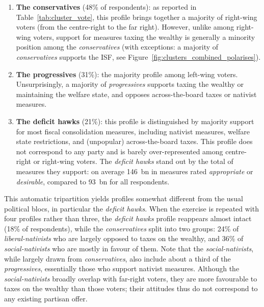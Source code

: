\documentclass[12pt,english]{article}
\newcommand{\blue}[1]{\textcolor{blue!60!black}{#1}}
\begin{document}
\begin{enumerate}
  \item \blue{\textbf{The conservatives} (48\% of respondents)}: as reported in Table~\ref{tab:cluster_vote}, this profile brings together a majority of right-wing voters (from the centre-right to the far right). However, unlike among right-wing voters, support for measures taxing the wealthy is generally a minority position among the \textit{conservatives} (with exceptions: a majority of \textit{conservatives} supports the ISF, see Figure~\ref{fig:clusters_combined_polarises}).
  \item \blue{\textbf{The progressives} (31\%)}: the majority profile among left-wing voters.
  Unsurprisingly, a majority of \textit{progressives} supports taxing the wealthy or maintaining the welfare state, and opposes across-the-board taxes or nativist measures.
  \item \blue{\textbf{The deficit hawks} (21\%): this profile is distinguished by majority support for most fiscal consolidation measures, including nativist measures, welfare state restrictions, and (unpopular) across-the-board taxes.} This profile does not correspond to any party and is barely over-represented among centre-right or right-wing voters. \blue{The \textit{deficit hawks} stand out by the total of measures they support:
  on average 146~bn in measures rated \textit{appropriate} or \textit{desirable}, compared to 93~bn for all respondents.}
\end{enumerate}

\begin{table}[htbp]
  \centering
  \caption{Respondent profiles by political bloc in \texttt{budget} clusterings.}
  \label{tab:cluster_vote}
  
\end{table}

This automatic tripartition yields profiles somewhat different from the usual political blocs, in particular the \textit{deficit hawks}. When the exercise is repeated with four profiles rather than three, the \textit{deficit hawks} profile reappears almost intact (18\% of respondents), while \blue{the \textit{conservatives} split into two groups: 24\% of \textit{liberal-nativists} who are largely opposed to taxes on the wealthy, and 36\% of \textit{social-nativists} who are mostly in favour of them}. Note that the \textit{social-nativists}, while largely drawn from \textit{conservatives}, also include about a third of the \textit{progressives}, essentially those who support nativist measures. Although the \textit{social-nativists} broadly overlap with far-right voters,
they are more favourable to taxes on the wealthy than those voters; their attitudes thus do not correspond to any existing partisan offer.
\end{document}
